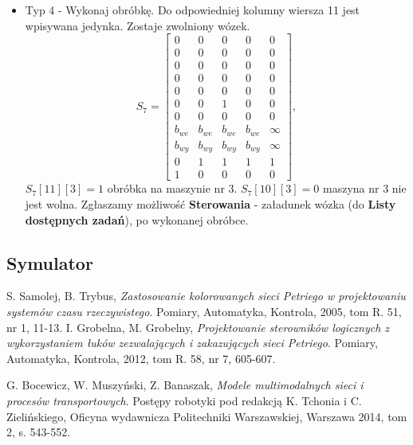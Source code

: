 \documentclass[10pt, a4paper]{article}
\begin{document}
\begin{itemize}
\item Typ 4 - Wykonaj obróbkę.
Do odpowiedniej kolumny wiersza 11 jest wpisywana jedynka. Zostaje zwolniony wózek. 
\begin{equation*}
S_7=\left[\begin{array}{ccccc}
0 & 0 & 0 & 0&0\\
0 & 0 & 0 & 0 & 0\\
0 & 0 & 0 & 0& 0\\
0 & 0 & 0 & 0& 0\\
0 & 0 & 0 & 0& 0\\
0 & 0 & 1 & 0 & 0\\
0 & 0 & 0 & 0& 0\\
b_{we}& b_{we}& b_{we}& b_{we} & \infty\\
b_{wy}& b_{wy}& b_{wy}& b_{wy} & \infty\\
0 & 1& 1& 1 & 1\\
1 & 0 & 0 & 0 & 0
\end{array}\right],
\end{equation*}
$S_7[11][3]=1$ obróbka na maszynie nr 3. $S_7[10][3]=0$ maszyna nr 3 nie jest wolna. Zgłaszamy możliwość \textbf{Sterowania} - załadunek wózka (do \textbf{Listy dostępnych zadań}), po wykonanej obróbce.
\end{itemize}
\subsection{Symulator}
\begin{thebibliography}{9}
  S. Samolej, B. Trybus,
  \emph{Zastosowanie kolorowanych sieci Petriego w projektowaniu systemów czasu rzeczywistego}.
  Pomiary, Automatyka, Kontrola,
  2005,
  tom R. 51, nr 1,
  11-13.
  I. Grobelna, M. Grobelny,
  \emph{Projektowanie sterowników logicznych z wykorzystaniem łuków zezwalających i zakazujących sieci Petriego}.	
  Pomiary, Automatyka, Kontrola,
  2012,
  tom R. 58, nr 7,
  605-607.
  
  G. Bocewicz, W. Muszyński, Z. Banaszak,
  \emph{Modele multimodalnych sieci i procesów transportowych}.
  Postępy robotyki pod redakcją K. Tchonia i C. Zielińskiego,
  Oficyna wydawnicza Politechniki Warszawskiej,
   Warszawa 2014,
   tom 2, s. 543-552.

\end{thebibliography}
\end{document}
